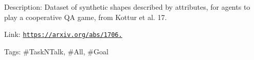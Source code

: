 Description\+: Dataset of synthetic shapes described by attributes, for agents to play a cooperative QA game, from Kottur et al. \textquotesingle{}17.

Link\+: \href{https://arxiv.org/abs/1706.08502}{\tt https\+://arxiv.\+org/abs/1706.}

Tags\+: \#\+Task\+N\+Talk, \#\+All, \#\+Goal 